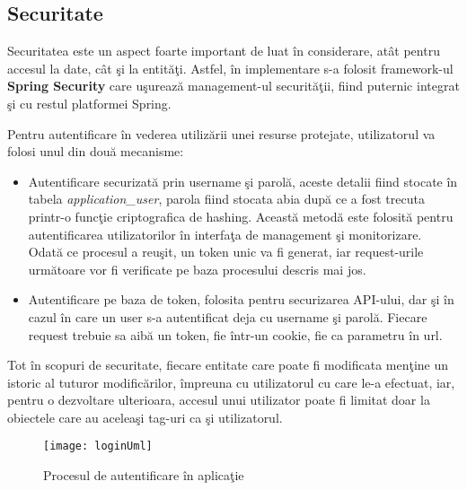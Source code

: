 \mend

\subsection{Securitate}
Securitatea este un aspect foarte important de luat în considerare, atât pentru accesul la date, cât şi la entităţi. Astfel, în implementare s-a folosit framework-ul \textbf{Spring Security} care uşurează management-ul securităţii, fiind puternic integrat şi cu restul platformei Spring.

Pentru autentificare în vederea utilizării unei resurse protejate, utilizatorul va folosi unul din două mecanisme:
\begin{itemize}
	\item Autentificare securizată prin username şi parolă, aceste detalii fiind stocate în tabela \textit{application\_user}, parola fiind stocata abia după ce a fost trecuta printr-o funcţie criptografica de hashing. Această metodă este folosită pentru autentificarea utilizatorilor în interfaţa de management şi monitorizare. Odată ce procesul a reuşit, un token unic va fi generat, iar request-urile următoare vor fi verificate pe baza procesului descris mai jos.
	\item Autentificare pe baza de token, folosita pentru securizarea API-ului, dar şi în cazul în care un user s-a autentificat deja cu username şi parolă. Fiecare request trebuie sa aibă un token, fie într-un cookie, fie ca parametru în url.
\end{itemize}
Tot în scopuri de securitate, fiecare entitate care poate fi modificata menţine un istoric al tuturor modificărilor, împreuna cu utilizatorul cu care le-a efectuat, iar, pentru o dezvoltare ulterioara, accesul unui utilizator poate fi limitat doar la obiectele care au aceleaşi tag-uri ca şi utilizatorul.
\begin{landscape}
	\begin{figure}
		\centering
		\texttt{[image: loginUml]}
		\caption{Procesul de autentificare în aplicaţie}
		\label{fig:loginUml}
	\end{figure}
\end{landscape}



